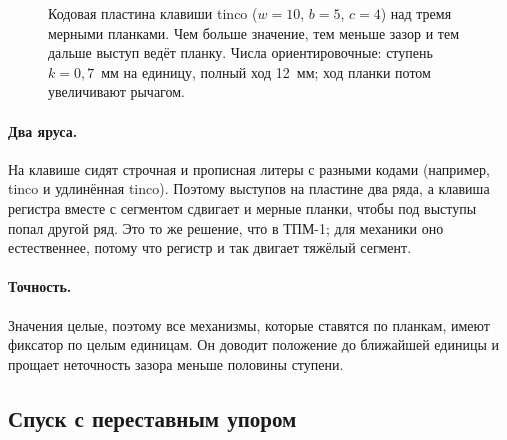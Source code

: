 \begin{figure}[h]
\centering
{}
\caption{Кодовая пластина клавиши tinco ($w = 10$, $b = 5$, $c = 4$) над тремя мерными планками. Чем больше значение, тем меньше зазор и тем дальше выступ ведёт планку. Числа ориентировочные: ступень $k = 0{,}7$~мм на единицу, полный ход 12~мм; ход планки потом увеличивают рычагом.}
\label{fig:plate}
\end{figure}

\paragraph{Два яруса.} На клавише сидят строчная и прописная литеры с разными кодами (например, tinco и удлинённая tinco). Поэтому выступов на пластине два ряда, а клавиша регистра вместе с сегментом сдвигает и мерные планки, чтобы под выступы попал другой ряд. Это то же решение, что в ТПМ-1; для механики оно естественнее, потому что регистр и так двигает тяжёлый сегмент.

\paragraph{Точность.} Значения целые, поэтому все механизмы, которые ставятся по планкам, имеют фиксатор по целым единицам. Он доводит положение до ближайшей единицы и прощает неточность зазора меньше половины ступени.

\subsection{Спуск с переставным упором}

